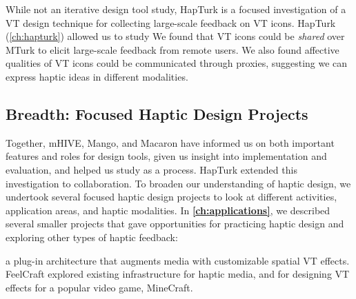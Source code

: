 	While not an iterative design tool study, HapTurk is a focused investigation of a VT design technique for collecting large-scale feedback on VT icons.
	HapTurk (\autoref{ch:hapturk}) allowed us to study 
	We found that VT icons could be \emph{shared} over MTurk to elicit large-scale feedback from remote users.
	We also found affective qualities of VT icons could be communicated through proxies, suggesting we can express haptic ideas in different modalities.


\subsection{Breadth: Focused Haptic Design Projects}
\label{ch:conclusion:approach:breadth}
Together, mHIVE, Mango, and Macaron have informed us on both important features and roles for design tools, given us insight into implementation and evaluation, and helped us study \haxd as a process.
HapTurk extended this investigation to collaboration.
To broaden our understanding of haptic design, we undertook several focused haptic design projects to look at different activities, application areas, and haptic modalities.
In \textbf{\autoref{ch:applications}}, we described several smaller projects that gave opportunities for practicing haptic design and exploring other types of haptic feedback:

  a plug-in architecture that augments media with customizable spatial VT effects.
	FeelCraft explored existing infrastructure for haptic media, and for designing VT effects for a popular video game, MineCraft.
	
